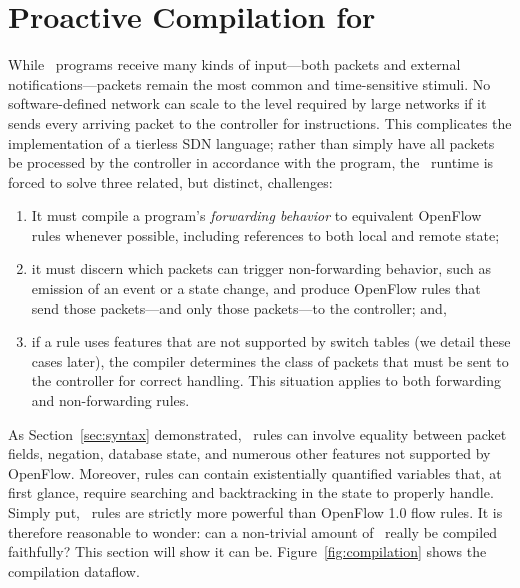 
\section{Proactive Compilation for \flowlog}
\label{sec:proactive}

While \flowlog\ programs receive many kinds of input---both packets and
external notifications---packets remain the most common and time-sensitive
stimuli.  No software-defined network can scale to the level required by large
networks if it sends every arriving packet to the controller for instructions.
This complicates the implementation of a tierless SDN language; rather than
simply have all packets be processed by the controller in accordance with the
program, the \flowlog\ runtime is forced to solve three related, but distinct, 
challenges:

\begin{enumerate} 

\item{It must compile a program's \emph{forwarding behavior} to
equivalent OpenFlow~\cite{McKeown:ccr08-openflow} rules whenever possible,
including references to both local and remote state;}

\item{it must discern which packets can trigger non-forwarding
behavior, such as emission of an event or a state change, and produce
OpenFlow rules that send those packets---and only those packets---to the
controller; and,}

\item{if a rule uses features that are not supported by switch tables (we
detail these cases later), the compiler determines the class of packets
that must be sent to the controller for correct handling.
This situation applies to both
forwarding and non-forwarding rules.}

\end{enumerate}
As Section~\ref{sec:syntax} demonstrated, \flowlog\ rules can
involve equality between packet fields, negation, database state, and
numerous other features not supported by OpenFlow. Moreover, rules
can contain existentially quantified variables that, at first glance, require
searching and backtracking in the state to properly handle. Simply put,
\flowlog\ rules are strictly more powerful than OpenFlow 1.0 flow rules. It is
therefore reasonable to wonder: can a non-trivial amount of \flowlog\ really
be compiled faithfully? This section will show it can be.
Figure~\ref{fig:compilation} shows the compilation dataflow.

